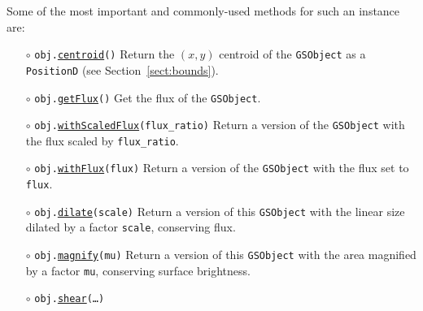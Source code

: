 \documentclass[preprint,10pt]{../../devel/modules/aastex}
\begin{document}
Some of the most important and commonly-used methods for such an
instance are:
\begin{itemize}
  \item[$\circ$]
  \texttt{obj.}\href{http://galsim-developers.github.io/GalSim/classgalsim_1_1base_1_1_g_s_object.html#a08a0bb72927fce3c765a9580de656d1a}{\texttt{centroid}}\texttt{()}
    \newline 
    Return the $(x, y)$ centroid of the \texttt{GSObject} as a
    \texttt{PositionD} (see Section~\ref{sect:bounds}).
  \item[$\circ$]
  \texttt{obj.}\href{http://galsim-developers.github.io/GalSim/classgalsim_1_1base_1_1_g_s_object.html#a662d8ce421ecd90080bdcaaf6890aed8}{\texttt{getFlux}}\texttt{()}
    \newline 
    Get the flux of the \texttt{GSObject}.
  \item[$\circ$]
  \texttt{obj.}\href{http://galsim-developers.github.io/GalSim/classgalsim_1_1base_1_1_g_s_object.html#a21a5b330e1c7565a2bb56258127d6149}{\texttt{withScaledFlux}}\texttt{(flux\_ratio)}
    \newline 
    Return a version of the \texttt{GSObject} with the flux scaled by \texttt{flux\_ratio}.
  \item[$\circ$]
  \texttt{obj.}\href{http://galsim-developers.github.io/GalSim/classgalsim_1_1base_1_1_g_s_object.html#a3f12b6158381ca5ef6da8e94f701f3e5}{\texttt{withFlux}}\texttt{(flux)}
    \newline 
    Return a version of the \texttt{GSObject} with the flux set to \texttt{flux}.
  \item[$\circ$]
  \texttt{obj.}\href{http://galsim-developers.github.io/GalSim/classgalsim_1_1base_1_1_g_s_object.html#a0e80b6924c48e9708dd9e475f3b48b5f}{\texttt{dilate}}\texttt{(scale)}
    \newline 
    Return a version of this \texttt{GSObject} with the linear size dilated by a
    factor \texttt{scale}, conserving flux.
  \item[$\circ$]
  \texttt{obj.}\href{http://galsim-developers.github.io/GalSim/classgalsim_1_1base_1_1_g_s_object.html#aac64da7ce1c4165ba048300fede29943}{\texttt{magnify}}\texttt{(mu)}
    \newline 
    Return a version of this \texttt{GSObject} with the area magnified by a
    factor \texttt{mu}, conserving surface brightness.
  \item[$\circ$]
  \texttt{obj.}\href{http://galsim-developers.github.io/GalSim/classgalsim_1_1base_1_1_g_s_object.html#acc3ac16f75958b4a14246e944662ce3f}{\texttt{shear}}\texttt{(\dots)}

\end{itemize}
\end{document}
